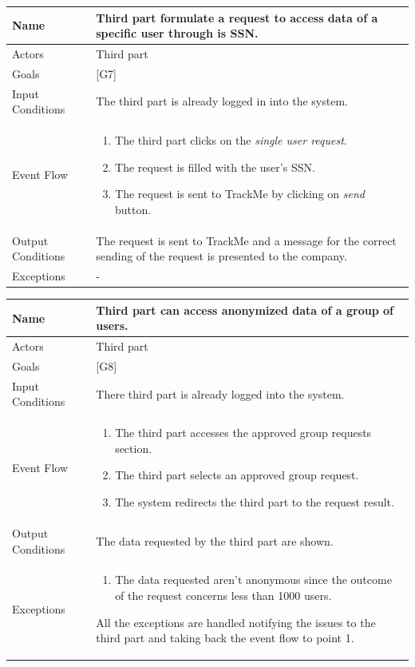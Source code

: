 \documentclass{article}
\begin{document}
\begin{center}
    \begin{tabular}{ | l | p{10cm} |}
    \hline
    Name & Third part formulate a request to access data of a specific user through is SSN. \\ \hline
    Actors & Third part\\ \hline
   	Goals & {[G7]}\\ \hline
    Input Conditions & The third part is already logged in into the system.\\ \hline
    Event Flow & \begin{enumerate}
    	\item The third part clicks on the \emph{single user request}.
    	\item The request is filled with the user's SSN.
    	\item The request is sent to TrackMe by clicking on \emph{send} button. 
    \end{enumerate} \\ \hline
    Output Conditions & The request is sent to TrackMe and a message for the correct sending of the request is presented to the company.  \\ \hline
    Exceptions & -    \\ \hline
    \end{tabular}
\end{center}

\begin{center}
    \begin{tabular}{ | l | p{10cm} |}
    \hline
    Name & Third part can access anonymized data of a group of users.\\ \hline
    Actors & Third part\\ \hline
   	Goals & {[G8]}\\ \hline
    Input Conditions & There third part is already logged into the system.\\ \hline
    Event Flow & \begin{enumerate}
    	\item The third part accesses the approved group requests section.
		\item The third part selects an approved group request.
		\item The system redirects the third part to the request result.
    \end{enumerate} \\ \hline
    Output Conditions & The data requested by the third part are shown.  \\ \hline
    Exceptions & \begin{enumerate}
  		\item The data requested aren't anonymous since the outcome of the request concerns less than 1000 users.
\end{enumerate} All the exceptions are handled notifying the issues to the third part and taking back the event flow to point 1.    \\ \hline
    \end{tabular}
\end{center}
\end{document}
